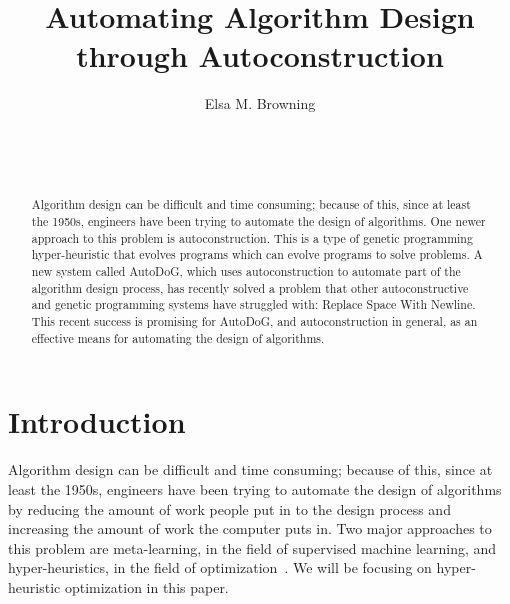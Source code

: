 \documentclass{sig-alternate}
\begin{document}

\title{Automating Algorithm Design through Autoconstruction}


\author{
\alignauthor
Elsa M. Browning\\
	\\
	\\
	\\
}

\maketitle
\begin{abstract}
	Algorithm design can be difficult and time consuming; because of this, since at least the 1950s, engineers have been trying to automate the design of algorithms. One newer approach to this problem is autoconstruction. This is a type of genetic programming hyper-heuristic that evolves programs which can evolve programs to solve problems. A new system called AutoDoG, which uses autoconstruction to automate part of the algorithm design process, has recently solved a problem that other autoconstructive and genetic programming systems have struggled with: Replace Space With Newline. This recent success is promising for AutoDoG, and autoconstruction in general, as an effective means for automating the design of algorithms.
\end{abstract}


\section{Introduction}
\label{sec:introduction}
Algorithm design can be difficult and time consuming; because of this, since at least the 1950s, engineers have been trying to automate the design of algorithms by reducing the amount of work people put in to the design process and increasing the amount of work the computer puts in. Two major approaches to this problem are meta-learning, in the field of supervised machine learning, and hyper-heuristics, in the field of optimization~\cite{pappa:2014}. We will be focusing on hyper-heuristic optimization in this paper.
\end{document}
